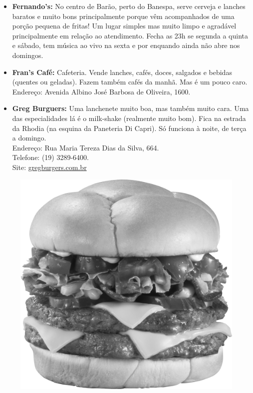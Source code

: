 \begin{itemize}
\item   \textbf{Fernando's:} No centro de Barão, perto do Banespa, serve cerveja
        e lanches baratos e muito bons principalmente porque vêm acompanhados de
        uma porção pequena de fritas! Um lugar simples mas muito limpo e
        agradável principalmente em relação ao atendimento. Fecha as 23h se
        segunda a quinta e sábado, tem música ao vivo na sexta e por enquando
        ainda não abre nos domingos.

\item   \textbf{Fran's Café:} Cafeteria. Vende lanches, cafés, doces, salgados e
        bebidas (quentes ou geladas). Fazem também cafés da manhã. Mas é um
        pouco caro.
        \\Endereço: Avenida Albino José Barbosa de Oliveira, 1600.

\item   \textbf{Greg Burguers:} Uma lanchenete muito boa, mas também muito cara.
        Uma das especialidades lá é o milk-shake (realmente muito bom). Fica na
        estrada da Rhodia (na esquina da Paneteria Di Capri). Só funciona à
        noite, de terça a domingo.
        \\Endereço: Rua Maria Tereza Dias da Silva, 664.
        \\Telefone: (19) 3289-6400.
        \\Site: \url{gregburgers.com.br}
\end{itemize}
\begin{figure}[h!]
    \centering
    \includegraphics[scale=0.48,keepaspectratio=true]{img/imgs/6-comida/burger.jpg}
\end{figure}


